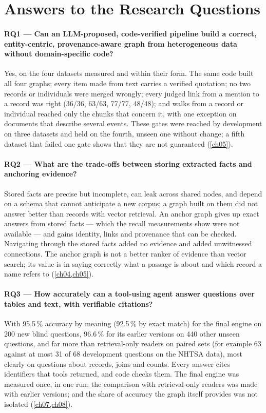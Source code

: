 \section{Answers to the Research Questions}\label{sec:ch09-answers}

\paragraph{RQ1 --- Can an LLM-proposed, code-verified pipeline build a correct, entity-centric, provenance-aware graph
from heterogeneous data without domain-specific code?} Yes, on the four datasets measured and within their form. The
same code built all four graphs; every item made from text carries a verified quotation; no two records or
individuals were merged wrongly; every judged link from a mention to a record was right (36/36, 63/63, 77/77, 48/48);
and walks from a record or individual reached only the chunks that concern it, with one exception on documents that
describe several events. These gates were reached by development on three datasets and held on the fourth, unseen one
without change; a fifth dataset that failed one gate shows that they are not guaranteed (\cref{ch05}).

\paragraph{RQ2 --- What are the trade-offs between storing extracted facts and anchoring evidence?} Stored facts are
precise but incomplete, can leak across shared nodes, and depend on a schema that cannot anticipate a new corpus; a
graph built on them did not answer better than records with vector retrieval. An anchor graph gives up exact answers
from stored facts --- which the recall measurements show were not available --- and gains identity, links and
provenance that can be checked. Navigating through the stored facts added no evidence and added unwitnessed
connections. The anchor graph is not a better ranker of evidence than vector search; its value is in saying correctly
what a passage is about and which record a name refers to (\cref{ch04,ch05}).

\paragraph{RQ3 --- How accurately can a tool-using agent answer questions over tables and text, with verifiable
citations?} With 95.5\,\% accuracy by meaning (92.5\,\% by exact match) for the final engine on 200 new blind questions,
96.6\,\% for its earlier versions on 440 other unseen questions, and far more than retrieval-only readers on paired
sets (for example 63 against at most 31 of 68 development questions on the NHTSA data), most clearly on questions
about records, joins and counts. Every answer cites identifiers that tools returned, and code checks them. The
final engine was measured once, in one run; the comparison with retrieval-only readers was made with earlier
versions; and the share of accuracy the graph itself provides was not isolated (\cref{ch07,ch08}).

